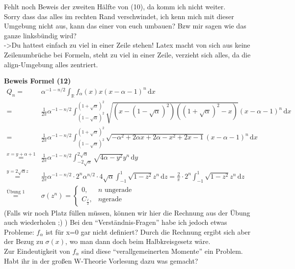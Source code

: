 \documentclass[a4paper, 11pt]{scrreprt}
\newenvironment{beweis}[1][Beweis]{\begin{trivlist}
	\item[\hskip \labelsep {\bfseries #1}]}
	{\end{trivlist}}
\newcommand{\RR}{\mathbb{R}}
\begin{document}
\begin{beweis}
Fehlt noch Beweis der zweiten Hälfte von (10), da komm ich nicht weiter.\\
Sorry dass das alles im rechten Rand verschwindet, ich kenn mich mit dieser Umgebung nicht aus, kann das einer von euch umbauen? Bzw mir sagen wie das ganze linksbündig wird?\\
->Du hattest einfach zu viel in einer Zeile stehen! Latex macht von sich aus keine Zeilenumbrüche bei Formeln, steht zu viel in einer Zeile, verzieht sich alles, da die align-Umgebung alles zentriert.



\textbf{Beweis Formel (12)}\\
\begin{align*}
	Q_n =& \alpha^{-1-n/2}\int_{\RR} f_{\alpha}(x)x(x-\alpha -1)^n\,\mathrm{d}x \\
	 =& \frac{1}{2\pi}\alpha^{-1-n/2} \int_{(1-\sqrt{\alpha})^2}^{(1+\sqrt{\alpha})^2} \sqrt{(x-(1-\sqrt{\alpha})^2)((1+\sqrt{\alpha})^2-x)} (x-\alpha -1)^n \,\mathrm{d}x\\
	=& \frac{1}{2\pi}\alpha^{-1-n/2} \int_{(1-\sqrt{\alpha})^2}^{(1+\sqrt{\alpha})^2} \sqrt{-\alpha^2+2\alpha x+2\alpha -x^2+2x-1}(x-\alpha-1)^n \,\mathrm{d}x\\
	\overset{x=y+\alpha+1}{=}& \frac{1}{2\pi}\alpha^{-1-n/2} \int_{-2\sqrt{\alpha}}^{2\sqrt{\alpha}} \sqrt{4\alpha -y^2} y^n \,\mathrm{d}y\\
	\overset{y=2\sqrt{\alpha}z}{=}& \frac{1}{2\pi}\alpha^{-1-n/2} \cdot 2^n \alpha^{n/2}\cdot4\sqrt{\alpha}\int_{-1}^{1} \sqrt{1-z^2}z^n \,\mathrm{d}z = \frac{2}{\pi} \cdot 2^n\int_{-1}^{1} \sqrt{1-z^2}z^n\,\mathrm{d}z \\
	\overset{\text{Übung 1}}{=}& \sigma(z^n) = \begin{cases} 0, &n\text{ ungerade}\\
	C_{\frac l 2}, &n\text{gerade} \end{cases}
\end{align*}
(Falls wir noch Platz füllen müssen, können wir hier die Rechnung aus der Übung auch wiederholen ;) )
Bei den "`Verständnis-Fragen"' habe ich jedoch etwas Probleme: \(f_{\alpha}\) ist für x=0 gar nicht definiert? Durch die Rechnung ergibt sich aber der Bezug zu \(\sigma(x)\), wo man dann doch beim Halbkreisgesetz wäre.\\
Zur Eindeutigkeit von \(f_{\alpha}\) sind diese "`verallgemeinerten Momente"' ein Problem. Habt ihr in der großen W-Theorie Vorlesung dazu was gemacht?



\end{beweis}
\end{document}
